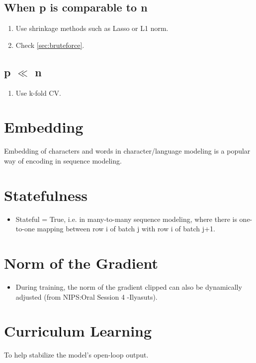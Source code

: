 \documentclass[a4paper, 12pt]{report}
\begin{document}
\subsection{When p is comparable to n}
\begin{enumerate}

\item Use shrinkage methods such as Lasso or L1 norm.
\item Check  \autoref{sec:bruteforce}.

\end{enumerate}

\subsection{p ${\ll}$ n}
\begin{enumerate}
\item Use k-fold CV.
\end{enumerate}

\section{Embedding}
Embedding of characters and words in character/language modeling is a popular way of encoding in sequence modeling.

\section{Statefulness}
\begin{itemize}
\item Stateful = True, i.e. in many-to-many sequence modeling, where there is one-to-one mapping between row i of batch j with row i of batch j+1.
\end{itemize}

\section{Norm of the Gradient}
\begin{itemize}
\item During training, the norm of the gradient clipped can also be dynamically adjusted ({\color{green}from NIPS:Oral Session 4 -Ilyasuts}).
\end{itemize}

\section{Curriculum Learning}
To help stabilize the model's open-loop output.
\end{document}
